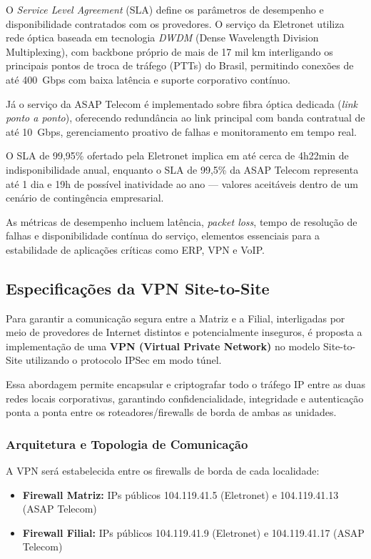 \documentclass[a4paper, 12pt]{article}
\begin{document}
O \textit{Service Level Agreement} (SLA) define os parâmetros de desempenho e disponibilidade contratados com os provedores. O serviço da Eletronet \cite{eletronet} utiliza rede óptica baseada em tecnologia \textit{DWDM} (Dense Wavelength Division Multiplexing), com backbone próprio de mais de 17 mil km interligando os principais pontos de troca de tráfego (PTTs) do Brasil, permitindo conexões de até 400~Gbps com baixa latência e suporte corporativo contínuo.

Já o serviço da ASAP Telecom \cite{asap} é implementado sobre fibra óptica dedicada (\textit{link ponto a ponto}), oferecendo redundância ao link principal com banda contratual de até 10~Gbps, gerenciamento proativo de falhas e monitoramento em tempo real.

O SLA de 99,95\% ofertado pela Eletronet implica em até cerca de 4h22min de indisponibilidade anual, enquanto o SLA de 99,5\% da ASAP Telecom representa até 1 dia e 19h de possível inatividade ao ano — valores aceitáveis dentro de um cenário de contingência empresarial.

As métricas de desempenho incluem latência, \textit{packet loss}, tempo de resolução de falhas e disponibilidade contínua do serviço, elementos essenciais para a estabilidade de aplicações críticas como ERP, VPN e VoIP.

\subsection{Especificações da VPN Site-to-Site}
\label{subsec:vpn}

Para garantir a comunicação segura entre a Matriz e a Filial, interligadas por meio de provedores de Internet distintos e potencialmente inseguros, é proposta a implementação de uma \textbf{VPN (Virtual Private Network)} no modelo Site-to-Site utilizando o protocolo IPSec em modo túnel.

Essa abordagem permite encapsular e criptografar todo o tráfego IP entre as duas redes locais corporativas, garantindo confidencialidade, integridade e autenticação ponta a ponta entre os roteadores/firewalls de borda de ambas as unidades.

\subsubsection{Arquitetura e Topologia de Comunicação}
\label{subsubsec:vpn-topology}

A VPN será estabelecida entre os firewalls de borda de cada localidade:
\begin{itemize}
    \item \textbf{Firewall Matriz:} IPs públicos 104.119.41.5 (Eletronet) e 104.119.41.13 (ASAP Telecom)
    \item \textbf{Firewall Filial:} IPs públicos 104.119.41.9 (Eletronet) e 104.119.41.17 (ASAP Telecom)
\end{itemize}
\end{document}
